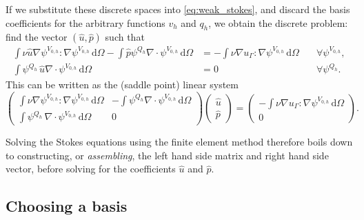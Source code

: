 \documentclass[thesis]{subfiles}
\begin{document}
If we substitute these discrete spaces into \cref{eq:weak_stokes}, and discard the basis coefficients for the arbitrary functions $v_h$ and $q_h$, we obtain the discrete problem: find the vector $(\hat u, \hat p)$ such that
\small
\begin{equation}
  \begin{aligned}
    \int \nu \hat u \nabla \psi^{V_{0,h}} : \nabla \psi^{V_{0,h}} \, \textrm{d}\Omega
    - \int \hat p \psi^{Q_h} \nabla \cdot \psi^{V_{0,h}} \, \textrm{d}\Omega
    &=
    - \int \nu \nabla u_\Gamma : \nabla \psi^{V_{0,h}} \, \textrm{d}\Omega
    \quad
    &\forall \psi^{V_{0,h}}, \\
    \int \psi^{Q_h} \, \hat u \nabla \cdot \psi^{V_{0,h}} \, \textrm{d}\Omega
    &= 0
    \quad
    &\forall \psi^{Q_h}.
  \end{aligned}
\end{equation}
\normalsize
This can be written as the (saddle point) linear system
\small
\begin{equation} \label{eq:stokes_linear_system}
  \left (
  \begin{array}{c|c}
    \int \nu \nabla \psi^{V_{0,h}} : \nabla \psi^{V_{0,h}} \, \textrm{d}\Omega
    &
    - \int \psi^{Q_h} \nabla \cdot \psi^{V_{0,h}} \, \textrm{d}\Omega \\
    \hline
    \int \psi^{Q_h} \, \nabla \cdot \psi^{V_{0,h}} \, \textrm{d}\Omega
    &
    0
  \end{array}
  \right )
  \left (
  \begin{array}{c}
    \hat u \\
    \hline
    \hat p
  \end{array}
  \right )
  =
  \left (
  \begin{array}{c}
    - \int \nu \nabla u_\Gamma : \nabla \psi^{V_{0,h}} \, \textrm{d}\Omega \\
    \hline
    0
  \end{array}
  \right ).
\end{equation}
\normalsize

Solving the Stokes equations using the finite element method therefore boils down to constructing, or \emph{assembling}, the left hand side matrix and right hand side vector, before solving for the coefficients $\hat u$ and $\hat p$.

\subsection{Choosing a basis}
\end{document}
